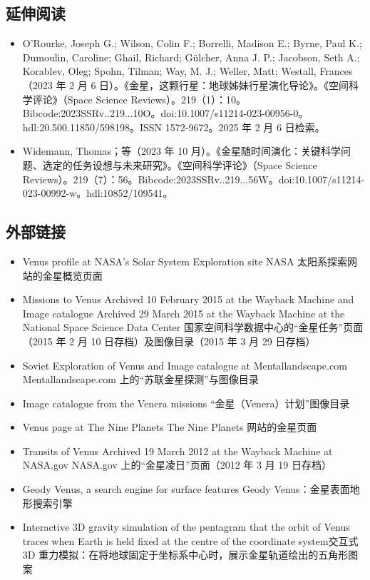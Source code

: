 \subsection{延伸阅读}
\begin{itemize}
\item O'Rourke, Joseph G.; Wilson, Colin F.; Borrelli, Madison E.; Byrne, Paul K.; Dumoulin, Caroline; Ghail, Richard; Gülcher, Anna J. P.; Jacobson, Seth A.; Korablev, Oleg; Spohn, Tilman; Way, M. J.; Weller, Matt; Westall, Frances（2023 年 2 月 6 日）。《金星，这颗行星：地球姊妹行星演化导论》。《空间科学评论》（Space Science Reviews）。219（1）：10。Bibcode:2023SSRv..219...10O。doi:10.1007/s11214-023-00956-0。hdl:20.500.11850/598198。ISSN 1572-9672。2025 年 2 月 6 日检索。
\item Widemann, Thomas；等（2023 年 10 月）。《金星随时间演化：关键科学问题、选定的任务设想与未来研究》。《空间科学评论》（Space Science Reviews）。219（7）：56。Bibcode:2023SSRv..219...56W。doi:10.1007/s11214-023-00992-w。hdl:10852/109541。
\end{itemize}
\subsection{外部链接}
\begin{itemize}
\item Venus profile at NASA's Solar System Exploration site
NASA 太阳系探索网站的金星概览页面
\item Missions to Venus Archived 10 February 2015 at the Wayback Machine and Image catalogue Archived 29 March 2015 at the Wayback Machine at the National Space Science Data Center
国家空间科学数据中心的“金星任务”页面（2015 年 2 月 10 日存档）及图像目录（2015 年 3 月 29 日存档）
\item Soviet Exploration of Venus and Image catalogue at Mentallandscape.com Mentallandscape.com 上的“苏联金星探测”与图像目录
\item Image catalogue from the Venera missions “金星（Venera）计划”图像目录
\item Venus page at The Nine Planets The Nine Planets 网站的金星页面
\item Transits of Venus Archived 19 March 2012 at the Wayback Machine at NASA.gov NASA.gov 上的“金星凌日”页面（2012 年 3 月 19 日存档）
\item Geody Venus, a search engine for surface features Geody Venus：金星表面地形搜索引擎
\item Interactive 3D gravity simulation of the pentagram that the orbit of Venus traces when Earth is held fixed at the centre of the coordinate system交互式 3D 重力模拟：在将地球固定于坐标系中心时，展示金星轨道绘出的五角形图案
\end{itemize}
